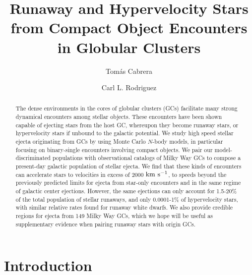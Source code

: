 \documentclass[twocolumn,linenumbers]{aastex631}
\newcommand{\kms}{${\rm km~s^{-1}}$}
\begin{document}
\title{Runaway and Hypervelocity Stars from Compact Object Encounters in Globular Clusters}

\author[0000-0002-1270-7666]{Tom\'as Cabrera}

\author[0000-0003-4175-8881]{Carl L. Rodriguez}

\begin{abstract}
    The dense environments in the cores of globular clusters (GCs) facilitate many strong dynamical encounters among stellar objects.
    These encounters have been shown capable of ejecting stars from the host GC, whereupon they become runaway stars, or hypervelocity stars if unbound to the galactic potential.
 	We study high speed stellar ejecta originating from GCs by using Monte Carlo $N$-body models, in particular focusing on binary-single encounters involving compact objects.
 	We pair our model-discriminated populations with observational catalogs of Milky Way GCs to compose a present-day galactic population of stellar ejecta.
 	We find that these kinds of encounters can accelerate stars to velocities in excess of 2000 \kms, to speeds beyond the previously predicted limits for ejecta from star-only encounters and in the same regime of galactic center ejections.
	However, the same ejections can only account for 1.5-20\% of the total population of stellar runaways, and only 0.0001-1\% of hypervelocity stars, with similar relative rates found for runaway white dwarfs.
	We also provide credible regions for ejecta from 149 Milky Way GCs, which we hope will be useful as supplementary evidence when pairing runaway stars with origin GCs.
\end{abstract}

\section{Introduction}
\label{sec:intro}
\end{document}
